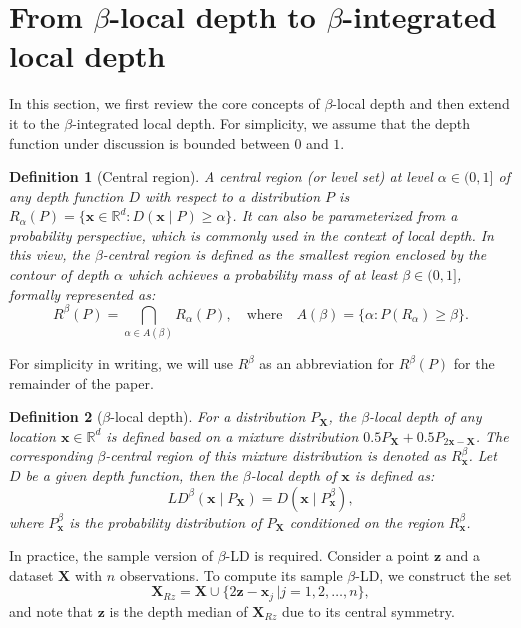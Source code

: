 \documentclass[final,3p,times]{elsarticle}
\newtheorem{thm}{\bf Definition}[section]
\newcommand{\vecx}{\mathbf{x}}
\newcommand{\vecX}{\mathbf{X}}
\newcommand{\vecz}{\mathbf{z}}
\begin{document}
\section{From $\beta$-local depth to $\beta$-integrated local depth}\label{Sec: betaLD}
In this section, we first review the core concepts of $\beta$-local depth and then extend it to the $\beta$-integrated local depth. For simplicity, we assume that the depth function under discussion is bounded between $0$ and $1$.
\begin{thm}[Central region]
    A central region (or level set) at level $\alpha\in (0,1]$ of any depth function $D$ with respect to a distribution $P$ is $R_\alpha(P)=\{\vecx \in \mathbb{R}^d: D(\vecx \mid P)\geq \alpha\}$. It can also be parameterized from a probability perspective, which is commonly used in the context of local depth. In this view, the $\beta$-central region is defined as the smallest region enclosed by the contour of depth $\alpha$ which achieves a probability mass of at least $\beta\in (0,1]$, formally represented as:
    $$
   R^\beta(P)=\bigcap\limits_{\alpha\in A(\beta)}R_\alpha(P),\quad\text{where}\quad A(\beta)=\{\alpha:P(R_\alpha)\geq\beta\} .
    $$
\end{thm}
For simplicity in writing, we will use $ R^\beta $ as an abbreviation for $ R^\beta(P) $ for the remainder of the paper.
\begin{thm}[$\beta$-local depth]
   For a distribution $P_\vecX$, the $\beta$-local depth of any location $\vecx \in \mathbb{R}^d$ is defined based on a mixture distribution $0.5P_\vecX + 0.5P_{2\vecx - \vecX}$. The corresponding $\beta$-central region of this mixture distribution is denoted as $R^\beta_\vecx$. Let $D$ be a given depth function, then the $\beta$-local depth of $\vecx$ is defined as: 
   \begin{equation}
       LD^\beta(\vecx \mid P_\vecX)=D(\vecx \mid P_\vecx^\beta),
   \end{equation}
where $P_\vecx^\beta$ is the probability distribution of $P_\vecX$ conditioned on the region $R^\beta_\vecx$. 
\end{thm}
In practice, the sample version of $\beta$-LD is required. Consider a point $\vecz$ and a dataset $\mathbf{X}$ with $n$ observations. To compute its sample $\beta$-LD, we construct the set  
$$\mathbf{X}_{Rz} = \mathbf{X} \cup \{ 2\vecz - \vecx_j \, | j = 1, 2, \ldots, n\},$$ 
and note that $\vecz$ is the depth median of $\mathbf{X}_{Rz}$ due to its central symmetry.
\end{document}
